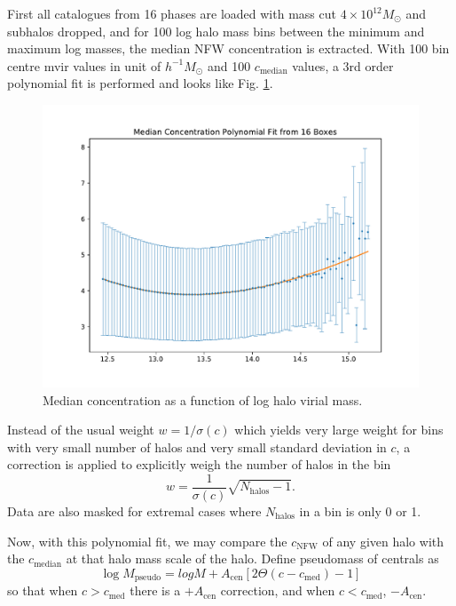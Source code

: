 \documentclass[fleqn,usenatbib]{mnras}
\begin{document}
			First all catalogues from 16 phases are loaded with mass cut $4\times 10^{12} M_\odot$ and subhalos dropped, and for 100 log halo mass bins between the minimum and maximum log masses, the median NFW concentration is extracted. With 100 bin centre mvir values in unit of $h^{-1} M_\odot$ and 100 $c_\text{median}$ values, a 3rd order polynomial fit is performed and looks like Fig. \ref{fig:c_median_poly}.
			
			\begin{figure}
				\includegraphics[width=\linewidth]{c_median_poly.pdf}
			    \caption{Median concentration as a function of log halo virial mass.}
			    \label{fig:c_median_poly}
			\end{figure}
			
			Instead of the usual weight $ w = 1/\sigma(c)$ which yields very large weight for bins with very small number of halos and very small standard deviation in $c$, a correction is applied to explicitly weigh the number of halos in the bin
			\begin{equation}
				w = \frac{1}{\sigma(c)}  \sqrt{N_\text{halos} - 1}.
			\end{equation}
			Data are also masked for extremal cases where $N_\text{halos}$ in a bin is only 0 or 1.
			
			Now, with this polynomial fit, we may compare the $c_\text{NFW}$ of any given halo with the $c_\text{median}$ at that halo mass scale of the halo. Define pseudomass of centrals as
			\begin{equation}
				\log M_\text{pseudo} = log M + A_\text{cen} \left[ 2 \Theta(c-c_\text{med}) - 1 \right]
			\end{equation}
			so that when $c > c_\text{med}$ there is a $+A_\text{cen}$ correction, and when $c < c_\text{med}$, $-A_\text{cen}$.
			
\end{document}
